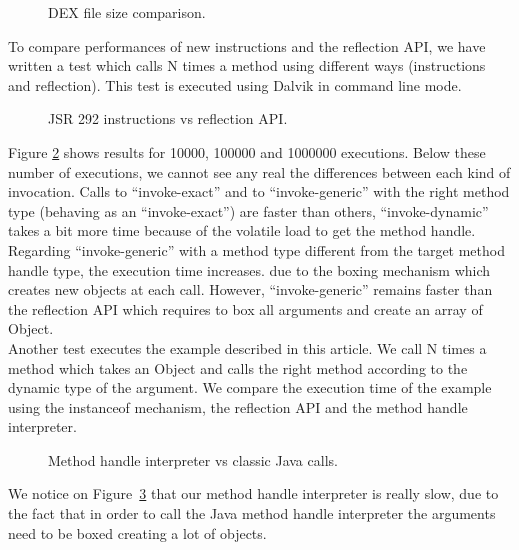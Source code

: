 \documentclass{sig-alternate}
\def \DALVIK{Dalvik\xspace}
\begin{document}
  \begin{figure}[h]
    \dataset
    \resizebox{\linewidth}{!}{}
    \caption{DEX file size comparison.}
    \label{Rsize}
  \end{figure}

  To compare performances of new instructions and the reflection API,
  we have written a test which calls N times a method using different ways (instructions and reflection).
  This test is executed using \DALVIK in command line mode.

  \begin{figure}[!h]
    \resizebox{\linewidth}{!}{}
    \caption{JSR 292 instructions vs reflection API.}
    \label{Rinvoke}
  \end{figure}

  Figure \ref{Rinvoke} shows results for 10000, 100000 and 1000000 executions.
  Below these number of executions, we cannot see any real the differences between each kind of invocation.
  Calls to ``invoke-exact'' and to ``invoke-generic'' with the right method type (behaving as an ``invoke-exact'') are faster than others,
  ``invoke-dynamic'' takes a bit more time because of the volatile load to get the method handle.
  Regarding ``invoke-generic'' with a method type different from the target method handle type, the execution time increases.
  due to the boxing mechanism which creates new objects at each call.
  However, ``invoke-generic'' remains faster than the reflection API which requires to box all arguments and create an array of Object.\\
  
  Another test executes the example described in this article.
  We call N times a method which takes an Object and calls the right method according to the dynamic type of the argument.
  We compare the execution time of the example using the instanceof mechanism, the reflection API and the method handle interpreter.

  \begin{figure}[!h]
    \resizebox{\linewidth}{!}{}
    \caption{Method handle interpreter vs classic Java calls.}\vspace{-1em}
    \label{Rmutable}
  \end{figure}

  We notice on Figure~\ref{Rmutable} that our method handle interpreter is really slow,
  due to the fact that in order to call the Java method handle interpreter the arguments need to be boxed creating a lot of objects.
\end{document}

